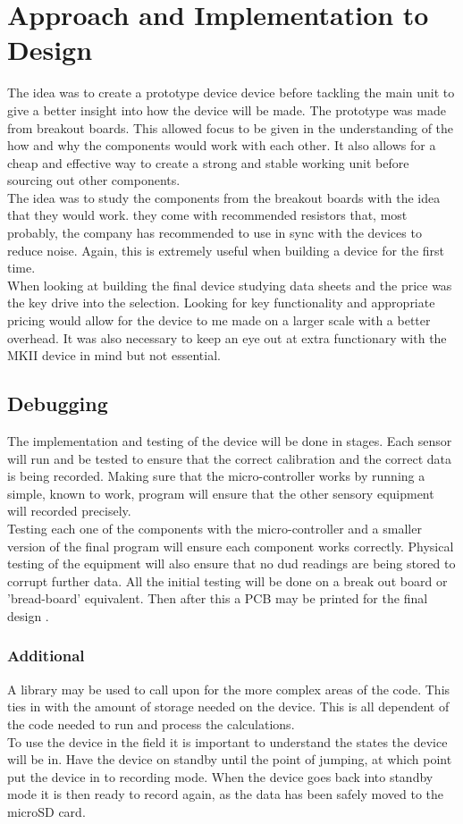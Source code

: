 \documentclass{report}
\begin{document}
\section{Approach and Implementation to Design}
The idea was to create a prototype device device before tackling the main unit to give a better insight into how the device will be made. The prototype was made from breakout boards. This allowed focus to be given in the understanding of the how and why the components would work with each other. It also allows for a cheap and effective way to create a strong and stable working unit before sourcing out other components. \\
The idea was to study the components from the breakout boards with the idea that they would work. they come with recommended resistors that, most probably, the company has recommended to use in sync with the devices to reduce noise. Again, this is extremely useful when building a device for the first time.\\
When looking at building the final device studying data sheets and the price was the key drive into the selection. Looking for key functionality and appropriate pricing would allow for the device to me made on a larger scale with a better overhead. It was also necessary to keep an eye out at extra functionary with the MKII device in mind but not essential.
  
\subsection{Debugging}
The implementation and testing of the device will be done in stages. Each sensor will run and be tested to ensure that the correct calibration and the correct data is being recorded. Making sure that the micro-controller works by running a simple, known to work, program will ensure that the other sensory equipment will recorded precisely. \\
Testing each one of the components with the micro-controller and a smaller version of the final program will ensure each component works correctly. Physical testing of the equipment will also ensure that no dud readings are being stored to corrupt further data. 
All the initial testing will be done on a break out board or 'bread-board' equivalent. Then after this a PCB may be printed for the final design .\\

\subsubsection{Additional}
A library  may be used to call upon for the more complex areas of the code. This ties in with the amount of storage needed on the device. This is all dependent of the code needed to run and process the calculations. \\
To use the device in the field it is important to understand the states the device will be in. Have the device on standby until the point of jumping, at which point put the device in to recording mode. When the device goes back into standby mode it is then ready to record again, as the data has been safely moved to the microSD card. 
  
\end{document}
